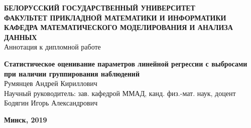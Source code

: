\begin{titlepage}
    \fontsize{12pt}{12pt}\selectfont
    \linespread{1.1}
    \begin{center}
    \vspace{0.5cm}
    \textbf{БЕЛОРУССКИЙ ГОСУДАРСТВЕННЫЙ УНИВЕРСИТЕТ}\\
    \vspace{0.5cm}
    \textbf{ФАКУЛЬТЕТ ПРИКЛАДНОЙ МАТЕМАТИКИ И ИНФОРМАТИКИ}\\
    \vspace{0.5cm}
    \fontsize{10pt}{10pt}\selectfont
    \textbf{КАФЕДРА МАТЕМАТИЧЕСКОГО МОДЕЛИРОВАНИЯ И АНАЛИЗА ДАННЫХ}\\
    \vspace{3.0cm}
    \fontsize{15pt}{15pt}\selectfont
    Аннотация к дипломной работе

    \fontsize{14pt}{14pt}\selectfont
    \vspace{0.5cm}
    \textbf{Статистическое оценивание параметров линейной регрессии с выбросами при наличии группирования наблюдений}\\
    
    \vspace{2.0cm}
    Румянцев Андрей Кириллович\\
    
    \vspace{5.5cm}
    Научный руководитель: зав. кафедрой ММАД, канд. физ.-мат. наук, доцент \\
    Бодягин Игорь Александрович\\
    \end{center}
    \vspace{7.0cm}
    \begin{center}
    \fontsize{15pt}{15pt}\selectfont
    \textbf{Минск, 2019}
    \end{center}
\end{titlepage}